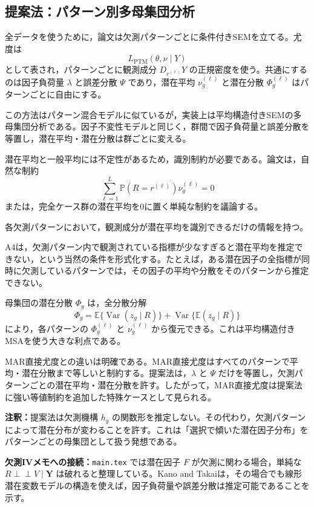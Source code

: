\documentclass[dvipdfmx,autodetect-engine]{jsarticle}
\newcommand{\E}{\mathbb{E}}
\newcommand{\Prb}{\mathbb{P}}
\newcommand{\Var}{\operatorname{Var}}
\newcommand{\indep}{\mathrel{\perp\!\!\!\perp}}
\newcommand{\note}[1]{\par\smallskip\noindent\textbf{注釈：}#1\par\smallskip}
\newcommand{\connect}[1]{\par\smallskip\noindent\textbf{欠測IVメモへの接続：}#1\par\smallskip}
\begin{document}
\subsection*{提案法：パターン別多母集団分析}

全データを使うために，論文は欠測パターンごとに条件付きSEMを立てる。尤度は
\[
L_{\mathrm{PTM}}(\theta,\nu\mid Y)
\]
として表され，パターンごとに観測成分 $D_{r^{(\ell)}}Y$ の正規密度を使う。共通にするのは因子負荷量 $\lambda$ と誤差分散 $\Psi$ であり，潜在平均 $\nu_g^{(\ell)}$ と潜在分散 $\Phi_g^{(\ell)}$ はパターンごとに自由にする。

この方法はパターン混合モデルに似ているが，実装上は平均構造付きSEMの多母集団分析である。因子不変性モデルと同じく，群間で因子負荷量と誤差分散を等置し，潜在平均・潜在分散は群ごとに変える。

潜在平均と一般平均には不定性があるため，識別制約が必要である。論文は，自然な制約
\[
\sum_{\ell=1}^L\Prb(R=r^{(\ell)})\nu_g^{(\ell)}=0
\]
または，完全ケース群の潜在平均を0に置く単純な制約を議論する。

\begin{description}[leftmargin=3.2em]
\item[A4] 各欠測パターンにおいて，観測成分が潜在平均を識別できるだけの情報を持つ。
\end{description}

A4は，欠測パターン内で観測されている指標が少なすぎると潜在平均を推定できない，という当然の条件を形式化する。たとえば，ある潜在因子の全指標が同時に欠測しているパターンでは，その因子の平均や分散をそのパターンから推定できない。

母集団の潜在分散 $\Phi_g$ は，全分散分解
\[
\Phi_g=\E\{\Var(z_g\mid R)\}+\Var\{\E(z_g\mid R)\}
\]
により，各パターンの $\Phi_g^{(\ell)}$ と $\nu_g^{(\ell)}$ から復元できる。これは平均構造付きMSAを使う大きな利点である。

MAR直接尤度との違いは明確である。MAR直接尤度はすべてのパターンで平均・潜在分散まで等しいと制約する。提案法は，$\lambda$ と $\Psi$ だけを等置し，欠測パターンごとの潜在平均・潜在分散を許す。したがって，MAR直接尤度は提案法に強い等値制約を追加した特殊ケースとして見られる。

\note{提案法は欠測機構 $h_g$ の関数形を推定しない。その代わり，欠測パターンによって潜在分布が変わることを許す。これは「選択で傾いた潜在因子分布」をパターンごとの母集団として扱う発想である。}

\connect{\texttt{main.tex} では潜在因子 $F$ が欠測に関わる場合，単純な $R\indep V\mid \bm Y$ は破れると整理している。Kano and Takaiは，その場合でも線形潜在変数モデルの構造を使えば，因子負荷量や誤差分散は推定可能であることを示す。}
\end{document}
